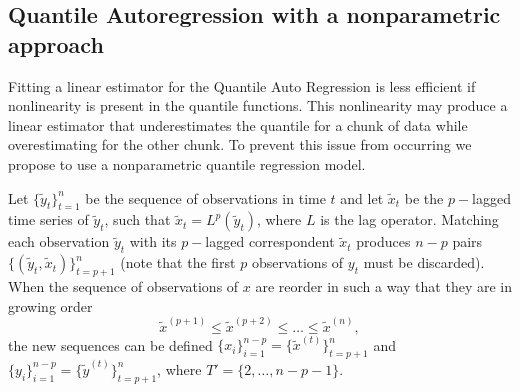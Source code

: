 \subsection{Quantile Autoregression with a nonparametric approach}
\label{sec:npqar}

Fitting a linear estimator for the Quantile Auto Regression is less efficient if nonlinearity is present in the quantile functions. This nonlinearity may produce a linear estimator that underestimates the quantile for a chunk of data while overestimating for the other chunk. To prevent this issue from occurring we propose to use a nonparametric quantile regression model. 



Let $\{\tilde{y}_t \}_{t=1}^n$ be the sequence of observations in time $t$ and let $\tilde{x}_t$ be the $p-$lagged time series of $\tilde{y}_t$, such that $\tilde{x}_t = L^p(\tilde{y}_t)$, where $L$ is the lag operator. Matching each observation $\tilde{y}_t$ with its $p-$lagged correspondent $\tilde{x}_t$ produces $n-p$ pairs $\{(\tilde{y}_t,\tilde{x}_t)\}_{t=p+1}^n$ (note that the first $p$ observations of $y_t$ must be discarded). When the sequence of observations of $x$ are reorder in such a way that they are in growing order
$$\tilde{x}^{(p+1)} \leq \tilde{x}^{(p+2)} \leq \dots \leq \tilde{x}^{(n)},$$ 
the new sequences can be defined $\{x_i\}_{i=1}^{n-p} = \{\tilde{x}^{(t)} \}_{t=p+1}^{n}$ and $\{y_i\}_{i=1}^{n-p} = \{\tilde{y}^{(t)} \}_{t=p+1}^{n}$, where $T' = \{2,\dots, n-p-1\}$. 

